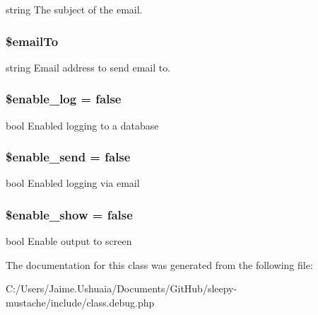 string The subject of the email. \hypertarget{class_debug_a2dca3002fa879522effbe7bd729d681d}{
\subsubsection[{\$email\-To}]{\setlength{\rightskip}{0pt plus 5cm}\$email\-To\hspace{0.3cm}{\ttfamily [static]}}}\label{class_debug_a2dca3002fa879522effbe7bd729d681d}
string Email address to send email to. \hypertarget{class_debug_abf6da1366fe6b13a73e55c0962433b5f}{
\subsubsection[{\$enable\-\_\-log}]{\setlength{\rightskip}{0pt plus 5cm}\$enable\-\_\-log = false\hspace{0.3cm}{\ttfamily [static]}}}\label{class_debug_abf6da1366fe6b13a73e55c0962433b5f}
bool Enabled logging to a database \hypertarget{class_debug_aeb64a58109ab72544114d51e42a3ca4f}{
\subsubsection[{\$enable\-\_\-send}]{\setlength{\rightskip}{0pt plus 5cm}\$enable\-\_\-send = false\hspace{0.3cm}{\ttfamily [static]}}}\label{class_debug_aeb64a58109ab72544114d51e42a3ca4f}
bool Enabled logging via email \hypertarget{class_debug_a5789d2d16b0d24dc6aa96b63b4f6f605}{
\subsubsection[{\$enable\-\_\-show}]{\setlength{\rightskip}{0pt plus 5cm}\$enable\-\_\-show = false\hspace{0.3cm}{\ttfamily [static]}}}\label{class_debug_a5789d2d16b0d24dc6aa96b63b4f6f605}
bool Enable output to screen 

The documentation for this class was generated from the following file\-:\begin{DoxyCompactItemize}
\item 
C\-:/\-Users/\-Jaime.\-Ushuaia/\-Documents/\-Git\-Hub/sleepy-\/mustache/include/class.\-debug.\-php\end{DoxyCompactItemize}

